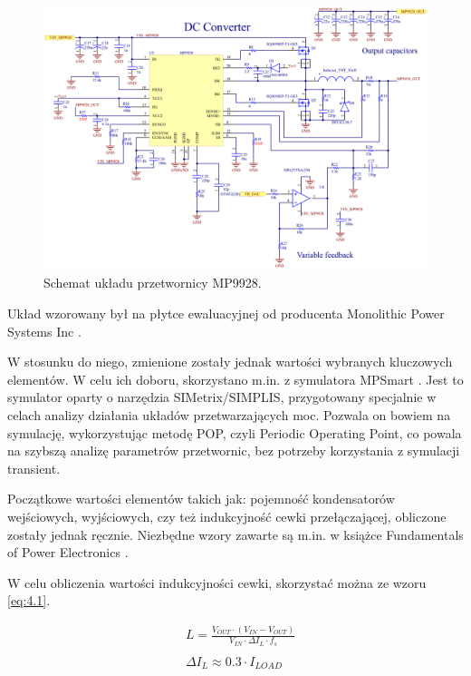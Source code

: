 \begin{figure}
    \begin{center}
        \includegraphics[width = 25cm]{images/przetwornicamp9928_3.png}
        \caption{Schemat układu przetwornicy MP9928.} 
        \label{fig:MP9928schematic}
    \end{center}
\end{figure}



Układ wzorowany był na płytce ewaluacyjnej od producenta Monolithic Power Systems Inc \cite{evalboardMP9928}.

W stosunku do niego, zmienione zostały jednak wartości wybranych kluczowych elementów. W celu ich doboru, skorzystano m.in.
z symulatora MPSmart \cite{mpsmart}. Jest to symulator oparty o narzędzia SIMetrix/SIMPLIS, przygotowany specjalnie 
w celach analizy działania układów przetwarzających moc. Pozwala on bowiem na symulację, wykorzystując metodę POP, czyli Periodic Operating Point,
co powala na szybszą analizę parametrów przetwornic, bez potrzeby korzystania z symulacji transient.

Początkowe wartości elementów takich jak: pojemność kondensatorów wejściowych, wyjściowych, czy też indukcyjność cewki przełączającej, obliczone zostały jednak ręcznie.
Niezbędne wzory zawarte są m.in. w książce Fundamentals of Power Electronics \cite{fundamentalsofpowerelectronics}.

W celu obliczenia wartości indukcyjności cewki, skorzystać można ze wzoru \ref{eq:4.1}.

\begin{equation}
    \label{eq:4.1}
    \begin{aligned}
        &L = \frac{V_{OUT} \cdot (V_{IN} - V_{OUT})}{V_{IN} \cdot \Delta I_{L} \cdot f_{s}} \\
        \\
        &\Delta I_{L} \approx 0.3 \cdot I_{LOAD}
    \end{aligned}
\end{equation}

